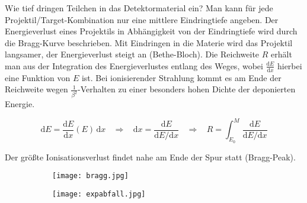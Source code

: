 \FloatBarrier
Wie tief dringen Teilchen in das Detektormaterial ein? Man kann für jede
Projektil/Target-Kombination nur eine mittlere Eindringtiefe angeben. Der Energieverlust eines
Projektils in Abhängigkeit von der Eindringtiefe wird durch die Bragg-Kurve beschrieben. Mit
Eindringen in die Materie wird das Projektil langsamer, der Energieverlust steigt an
(Bethe-Bloch). Die Reichweite $R$ erhält man aus der Integration des Energieverlustes entlang des
Weges, wobei $\frac{\mathrm{d}E}{\mathrm{d}x}$ hierbei eine Funktion von $E$ ist. Bei ionisierender Strahlung kommt es
am Ende der Reichweite wegen $\frac{1}{\beta^2}$-Verhalten zu einer besonders hohen Dichte der
deponierten Energie.

\[\mathrm{d}E= \frac{\mathrm{d}E}{\mathrm{d}x}(E)\,\mathrm{d}x~~~~\Rightarrow~~~~\mathrm{d}x
=\frac{\mathrm{d}E}{\mathrm{d}E/\mathrm{d}x}~~~~\Rightarrow~~~~ R=\int_{E_0}^{M} \frac{\mathrm{d}E}{\mathrm{d}E/\mathrm{d}x}  \]

Der größte Ionisationsverlust findet nahe am Ende der Spur statt (Bragg-Peak).




% 
% 

\begin{figure}[htbp]
	\begin{minipage}[b]{0.5\textwidth}
		\begin{figure}[H]
		\centering
		\texttt{[image: bragg.jpg]}
		\end{figure}
	\end{minipage}
	\hfill
	\begin{minipage}[b]{0.5\textwidth}
		\begin{figure}[H]
		\centering
		\texttt{[image: expabfall.jpg]}
		\end{figure}
	\end{minipage} 
\end{figure}

\FloatBarrier